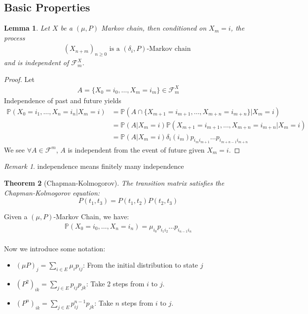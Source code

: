 \documentclass[a4paper,11pt]{book}
\newtheorem{theorem}{Theorem}[section]
\newtheorem{lemma}[theorem]{Lemma}
\theoremstyle{definition}
\theoremstyle{remark}
\newtheorem*{remark}{Remark}
\begin{document}
\subsection{Basic Properties}
\begin{lemma}
	Let $X$ be a $(\mu, P)$ Markov chain, then conditioned on $X_m = i$, the process
	\begin{align*}
		(X_{n + m})_{n \geq 0} \text{ is a $(\delta_i, P)$-Markov chain }
	\end{align*}
	and is independent of $\mathcal{F}_m^X$.
\end{lemma}
\begin{proof}
	Let
	\begin{align*}
		A = \{X_0 = i_0, \dots, X_m = i_m\} \in \mathcal{F}_m^X
	\end{align*}
	Independence of past and future yields
	\begin{align*}
		\mathbb{P}(X_0= i_1, \dots, X_n = i_n| X_m = i) &= \mathbb{P}(A \cap \{X_{m+1} = i_{m+1}, \dots, X_{m+n} = i_{m+n}\}|X_m = i) \\
	&= \mathbb{P}(A|X_m = i)\mathbb{P}(X_{m+1} = i_{m+1}, \dots, X_{m+n} = i_{m+n}|X_m = i) \\
	&= \mathbb{P}(A|X_m = i) \delta_i(i_m) p_{i_m i_{m+1}} \dots p_{i_{m+n-1}i_{m+n}}
	\end{align*}
	We see $\forall A \in \mathcal{F}^m$, $A$ is independent from the event of future given $X_m = i$. 
\end{proof}
\begin{remark}
independence means finitely many independence
\end{remark}

\begin{theorem}[Chapman-Kolmogorov]
	The transition matrix satisfies the Chapman-Kolmogorov equation:
	\begin{equation*}
		P(t_1, t_3) = P(t_1, t_2) P(t_2, t_3)
	\end{equation*}
\end{theorem}
 Given a $(\mu, P)$-Markov Chain, we have:
 \begin{align*}
 	\mathbb{P}(X_0= i_0, \dots, X_n = i_n) = \mu_{i_0}p_{i_1i_2} \dots p_{i_{n-1}i_n}
 \end{align*}
\quad\\
Now we introduce some notation:
\begin{itemize}
	\item $(\mu P)_j = \sum_{i \in E}\mu_i p_{ij}$: From the initial distribution to state $j$
	\item $(P^2)_{ik} = \sum_{j \in E}p_{ij}p_{jk}$: Take 2 steps from $i$ to $j$. 
	\item $(P^n)_{ik} = \sum_{j \in E} p_{ij}^{n-1}  p_{jk}$: Take $n$ steps from $i$ to $j$.
\end{itemize}
\end{document}
